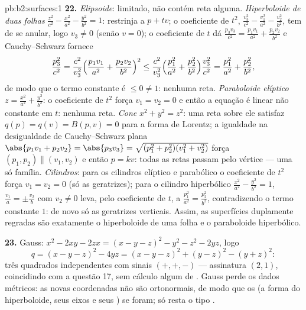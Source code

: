\begin{solution}{pb:b2:surfaces:1}
\textbf{22.} \emph{Elipsoide}: limitado, não contém reta alguma.
\emph{Hiperboloide de duas folhas} $\frac{z^2}{c^2} -
\frac{x^2}{a^2} - \frac{y^2}{b^2} = 1$: restrinja a $p + tv$;
o coeficiente de $t^2$, $\frac{v_3^2}{c^2} - \frac{v_1^2}{a^2}
- \frac{v_2^2}{b^2}$, tem de se anular, logo $v_3 \neq 0$ (senão $v =
0$); o coeficiente de $t$ dá $\frac{p_3v_3}{c^2} =
\frac{p_1v_1}{a^2} + \frac{p_2v_2}{b^2}$ e Cauchy--Schwarz
fornece
\[
\frac{p_3^2}{c^2}
= \frac{c^2}{v_3^2}\Bigl(\frac{p_1v_1}{a^2} +
\frac{p_2v_2}{b^2}\Bigr)^2
\leq \frac{c^2}{v_3^2}\Bigl(\frac{p_1^2}{a^2} +
\frac{p_2^2}{b^2}\Bigr)\frac{v_3^2}{c^2}
= \frac{p_1^2}{a^2} + \frac{p_2^2}{b^2},
\]
de modo que o termo constante é $\leq 0 \neq 1$: nenhuma reta.
\emph{Paraboloide elíptico} $z = \frac{x^2}{a^2} +
\frac{y^2}{b^2}$: o coeficiente de $t^2$ força $v_1 = v_2 =
0$ e então a equação é linear não constante em $t$: nenhuma reta.
\emph{Cone} $x^2 + y^2 = z^2$: uma reta sobre ele satisfaz $q(p) =
q(v) = B(p, v) = 0$ para a forma de Lorentz; a igualdade na
desigualdade de Cauchy--Schwarz plana $\abs{p_1v_1 + p_2v_2} = \abs{p_3v_3} =
\sqrt{(p_1^2 + p_2^2)(v_1^2 + v_2^2)}$ força $(p_1, p_2)
\parallel (v_1, v_2)$ e então $p = kv$: todas as retas passam
pelo vértice --- uma só família. \emph{Cilindros}: para os
cilindros elíptico e parabólico o coeficiente de $t^2$ força
$v_1 = v_2 = 0$ (só as geratrizes); para o cilindro hiperbólico
$\frac{x^2}{a^2} - \frac{y^2}{b^2} = 1$, $\frac{v_1}a = \pm
\frac{v_2}b$ com $v_2 \neq 0$ leva, pelo coeficiente de $t$,
a $\frac{p_1^2}{a^2} = \frac{p_2^2}{b^2}$, contradizendo o
termo constante $1$: de novo só as geratrizes verticais. Assim, as
superfícies  duplamente regradas são exatamente o hiperboloide
de uma folha e o paraboloide hiperbólico.

\textbf{23.} Gauss: $x^2 - 2xy - 2zx = (x - y - z)^2 - y^2 -
z^2 - 2yz$, logo
\[
q = (x - y - z)^2 - 4yz = (x - y - z)^2 + (y - z)^2 - (y +
z)^2 :
\]
três quadrados independentes com sinais $(+, +, -)$ --- assinatura
$(2, 1)$, coincidindo com a questão 17, sem cálculo algum de
. Gauss perde os dados métricos: as novas coordenadas
não são ortonormais, de modo que os  (a forma do
hiperboloide, seus eixos e seus ) se foram; só resta o
tipo .


\end{solution}
